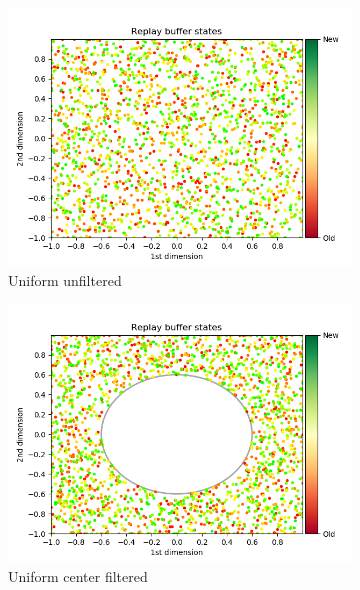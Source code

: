 \documentclass{article}
\begin{document}
\begin{figure}[H]
  \centering
  \begin{subfigure}[b]{0.3\linewidth}
    \includegraphics[width=\linewidth]{Study_2/visualizations/uniform.png}
    \caption{Uniform unfiltered}
  \end{subfigure}
  \begin{subfigure}[b]{0.3\linewidth}
    \includegraphics[width=\linewidth]{Study_2/2.1/visualizations/uniform-center.png}
      \caption{Uniform center filtered}
  \end{subfigure}
   \begin{subfigure}[b]{0.3\linewidth}

\end{subfigure}
\end{figure}
\end{document}
